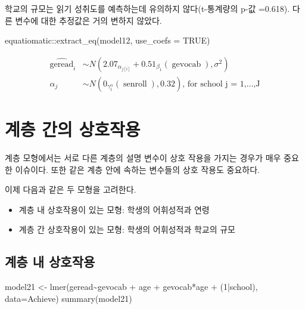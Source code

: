 \documentclass[
]{book}
\newenvironment{Shaded}{\begin{snugshade}}{\end{snugshade}}
\newcommand{\AttributeTok}[1]{\textcolor[rgb]{0.77,0.63,0.00}{#1}}
\newcommand{\ConstantTok}[1]{\textcolor[rgb]{0.00,0.00,0.00}{#1}}
\newcommand{\DecValTok}[1]{\textcolor[rgb]{0.00,0.00,0.81}{#1}}
\newcommand{\FunctionTok}[1]{\textcolor[rgb]{0.00,0.00,0.00}{#1}}
\newcommand{\NormalTok}[1]{#1}
\newcommand{\OtherTok}[1]{\textcolor[rgb]{0.56,0.35,0.01}{#1}}
\newcommand{\SpecialCharTok}[1]{\textcolor[rgb]{0.00,0.00,0.00}{#1}}
\providecommand{\tightlist}{%
  \setlength{\itemsep}{0pt}\setlength{\parskip}{0pt}}
\begin{document}
학교의 규모는 읽기 성취도를 예측하는데 유의하지 않다(t-통계량의 p-값 =0.618). 다른 변수에 대한 추정값은 거의 변하지 않았다.

\begin{Shaded}
\begin{Highlighting}[]
\NormalTok{equatiomatic}\SpecialCharTok{::}\FunctionTok{extract\_eq}\NormalTok{(model12, }\AttributeTok{use\_coefs =} \ConstantTok{TRUE}\NormalTok{)}
\end{Highlighting}
\end{Shaded}

\[
\begin{aligned}
  \operatorname{\widehat{geread}}_{i}  &\sim N \left(2.07_{\alpha_{j[i]}} + 0.51_{\beta_{1}}(\operatorname{gevocab}), \sigma^2 \right) \\
    \alpha_{j}  &\sim N \left(0_{\gamma_{1}^{\alpha}}(\operatorname{senroll}), 0.32 \right)
    \text{, for school j = 1,} \dots \text{,J}
\end{aligned}
\]

\hypertarget{uxacc4uxce35-uxac04uxc758-uxc0c1uxd638uxc791uxc6a9}{%
\section{계층 간의 상호작용}\label{uxacc4uxce35-uxac04uxc758-uxc0c1uxd638uxc791uxc6a9}}

계층 모형에서는 서로 다른 계층의 설명 변수이 상호 작용을 가지는 경우가 매우 중요한 이슈이다.
또한 같은 계층 안에 속하는 변수들의 상호 작용도 중요하다.

이제 다음과 같은 두 모형을 고려한다.

\begin{itemize}
\tightlist
\item
  계층 내 상호작용이 있는 모형: 학생의 어휘성적과 연령
\item
  계층 간 상호작용이 있는 모형: 학생의 어휘성적과 학교의 규모
\end{itemize}

\hypertarget{uxacc4uxce35-uxb0b4-uxc0c1uxd638uxc791uxc6a9}{%
\subsection{계층 내 상호작용}\label{uxacc4uxce35-uxb0b4-uxc0c1uxd638uxc791uxc6a9}}

\begin{Shaded}
\begin{Highlighting}[]
\NormalTok{model21 }\OtherTok{\textless{}{-}} \FunctionTok{lmer}\NormalTok{(geread}\SpecialCharTok{\textasciitilde{}}\NormalTok{gevocab }\SpecialCharTok{+}\NormalTok{ age }\SpecialCharTok{+}\NormalTok{ gevocab}\SpecialCharTok{*}\NormalTok{age }\SpecialCharTok{+}\NormalTok{ (}\DecValTok{1}\SpecialCharTok{|}\NormalTok{school), }\AttributeTok{data=}\NormalTok{Achieve)}
\FunctionTok{summary}\NormalTok{(model21)}
\end{Highlighting}
\end{Shaded}
\end{document}
